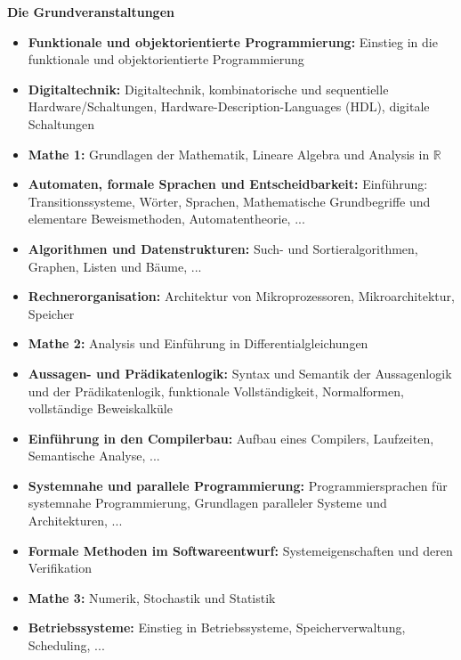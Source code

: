 {    \clearpage
    \noindent\textbf{Die Grundveranstaltungen}
    \begin{itemize}
        \item\textbf{Funktionale und objektorientierte Programmierung:} Einstieg in die funktionale und objektorientierte Programmierung
        \item\textbf{Digitaltechnik:}
        Digitaltechnik, kombinatorische und sequentielle Hardware/Schaltungen, Hardware-Description-Languages (HDL), digitale Schaltungen
        \item\textbf{Mathe 1:}
        Grundlagen der Mathematik, Lineare Algebra und Analysis in $\mathbb{R}$
        \item\textbf{Automaten, formale Sprachen und Entscheidbarkeit:} Einführung: Transitionssysteme, Wörter, Sprachen, Mathematische Grundbegriffe und elementare Beweismethoden, Automatentheorie, ...
        \item\textbf{Algorithmen und Datenstrukturen:} Such- und Sortieralgorithmen, Graphen, Listen und Bäume, ...
        \item\textbf{Rechnerorganisation:}
        Architektur von Mikroprozessoren, Mikroarchitektur, Speicher
        \item\textbf{Mathe 2:}
        Analysis und Einführung in Differentialgleichungen
        \item\textbf{Aussagen- und Prädikatenlogik:}
        Syntax und Semantik der Aussagenlogik und der Prädikatenlogik, funktionale Vollständigkeit, Normalformen, vollständige Beweiskalküle
        \item\textbf{Einführung in den Compilerbau:} Aufbau eines Compilers, Laufzeiten, Semantische Analyse, ...
        \item\textbf{Systemnahe und parallele Programmierung:} Programmiersprachen für systemnahe Programmierung, Grundlagen paralleler Systeme und Architekturen, ...
        \item\textbf{Formale Methoden im Softwareentwurf:}
        Systemeigenschaften und deren Verifikation
        \item\textbf{Mathe 3:}
        Numerik, Stochastik und Statistik
        \item\textbf{Betriebssysteme:} Einstieg in Betriebssysteme, Speicherverwaltung, Scheduling, ...
    \end{itemize}




}
